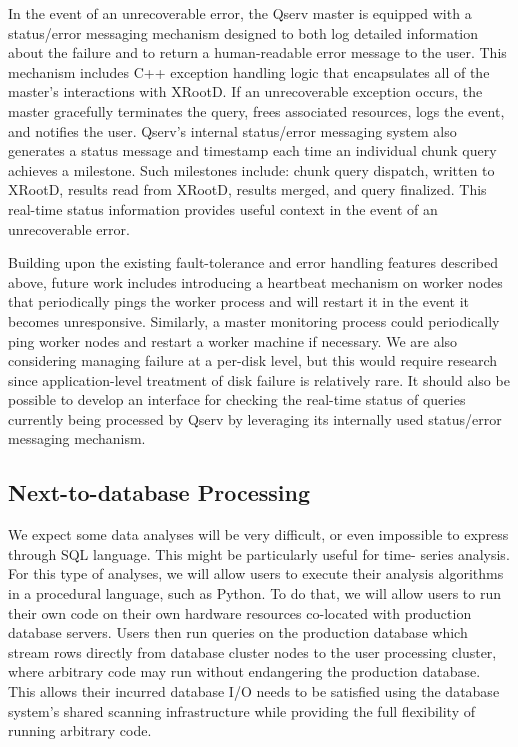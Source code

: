 \documentclass[DM,lsstdraft,toc]{lsstdoc}
\begin{document}
In the event of an unrecoverable error, the Qserv master is equipped with a
status/error messaging mechanism designed to both log detailed information
about the failure and to return a human-readable error message to the user.
This mechanism includes C++ exception handling logic that encapsulates all of
the master's interactions with XRootD. If an unrecoverable exception occurs,
the master gracefully terminates the query, frees associated resources, logs
the event, and notifies the user. Qserv's internal status/error messaging
system also generates a status message and timestamp each time an individual
chunk query achieves a milestone. Such milestones include: chunk query
dispatch, written to XRootD, results read from XRootD, results merged, and
query finalized. This real-time status information provides useful context in
the event of an unrecoverable error.

Building upon the existing fault-tolerance and error handling features
described above, future work includes introducing a heartbeat mechanism on
worker nodes that periodically pings the worker process and will restart it in
the event it becomes unresponsive. Similarly, a master monitoring process
could periodically ping worker nodes and restart a worker machine if
necessary. We are also considering managing failure at a per-disk level, but
this would require research since application-level treatment of disk failure
is relatively rare. It should also be possible to develop an interface for
checking the real-time status of queries currently being processed by Qserv by
leveraging its internally used status/error messaging mechanism.

\subsection{Next-to-database Processing}\label{next-to-database-processing}

We expect some data analyses will be very difficult, or even impossible to
express through SQL language. This might be particularly useful for time-
series analysis. For this type of analyses, we will allow users to execute
their analysis algorithms in a procedural language, such as Python. To do
that, we will allow users to run their own code on their own hardware
resources co-located with production database servers. Users then run queries
on the production database which stream rows directly from database cluster
nodes to the user processing cluster, where arbitrary code may run without
endangering the production database. This allows their incurred database I/O
needs to be satisfied using the database system's shared scanning
infrastructure while providing the full flexibility of running arbitrary code.
\end{document}
